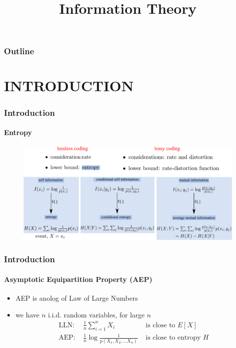 
\title{Information Theory}
\begin{frame}[plain]\logoTechTower
	\titlepage
\end{frame}

\begin{frame}
\frametitle{Outline}
\logoCSIPCPL\logoTechTower
	\setcounter{tocdepth}{1}	
	\tableofcontents
\end{frame}

\section{INTRODUCTION}
\begin{frame}
\frametitle{Introduction}
\framesubtitle{Entropy}
\logoCSIPCPL\mypagenum
	\begin{figure}				
		\includegraphics[width=1.0\textwidth]{figs/IT_entropy.pdf}
	\end{figure}
\end{frame}


\begin{frame}
\frametitle{Introduction}
\framesubtitle{Asymptotic Equipartition Property (AEP)}
\logoCSIPCPL\mypagenum
{}
	\begin{itemize}
		\item AEP is anolog of Law of Large Numbers
		\item we have $n$ i.i.d. random variables, for large $n$
			\begin{equation*}
				\begin{array}{lll}
				\mbox{LLN: }&	\frac{1}{n}\sum\limits_{i=1}^n X_i &\mbox{ is close to } E[X] \\
				\mbox{AEP: }&	\frac{1}{n}\log \frac{1}{p(X_1, X_2, \ldots X_n)} &\mbox{ is close to entropy } H
				\end{array}
			\end{equation*}
	\end{itemize}	
\end{frame}




